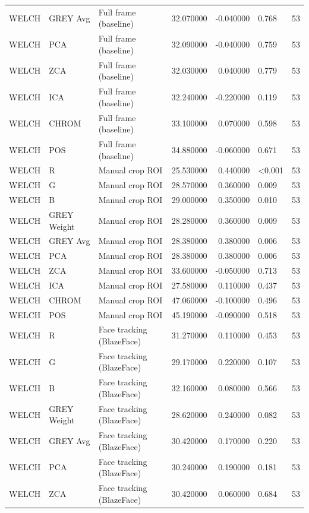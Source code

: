 \begin{table}[htbp]
\begin{tabular}{l l l r r l r}
WELCH & GREY Avg & Full frame (baseline) & 32.070000 & -0.040000 & 0.768 & 53 \\
WELCH & PCA & Full frame (baseline) & 32.090000 & -0.040000 & 0.759 & 53 \\
WELCH & ZCA & Full frame (baseline) & 32.030000 & 0.040000 & 0.779 & 53 \\
WELCH & ICA & Full frame (baseline) & 32.240000 & -0.220000 & 0.119 & 53 \\
WELCH & CHROM & Full frame (baseline) & 33.100000 & 0.070000 & 0.598 & 53 \\
WELCH & POS & Full frame (baseline) & 34.880000 & -0.060000 & 0.671 & 53 \\
WELCH & R & Manual crop ROI & 25.530000 & 0.440000 & <0.001 & 53 \\
WELCH & G & Manual crop ROI & 28.570000 & 0.360000 & 0.009 & 53 \\
WELCH & B & Manual crop ROI & 29.000000 & 0.350000 & 0.010 & 53 \\
WELCH & GREY Weight & Manual crop ROI & 28.280000 & 0.360000 & 0.009 & 53 \\
WELCH & GREY Avg & Manual crop ROI & 28.380000 & 0.380000 & 0.006 & 53 \\
WELCH & PCA & Manual crop ROI & 28.380000 & 0.380000 & 0.006 & 53 \\
WELCH & ZCA & Manual crop ROI & 33.600000 & -0.050000 & 0.713 & 53 \\
WELCH & ICA & Manual crop ROI & 27.580000 & 0.110000 & 0.437 & 53 \\
WELCH & CHROM & Manual crop ROI & 47.060000 & -0.100000 & 0.496 & 53 \\
WELCH & POS & Manual crop ROI & 45.190000 & -0.090000 & 0.518 & 53 \\
WELCH & R & Face tracking (BlazeFace) & 31.270000 & 0.110000 & 0.453 & 53 \\
WELCH & G & Face tracking (BlazeFace) & 29.170000 & 0.220000 & 0.107 & 53 \\
WELCH & B & Face tracking (BlazeFace) & 32.160000 & 0.080000 & 0.566 & 53 \\
WELCH & GREY Weight & Face tracking (BlazeFace) & 28.620000 & 0.240000 & 0.082 & 53 \\
WELCH & GREY Avg & Face tracking (BlazeFace) & 30.420000 & 0.170000 & 0.220 & 53 \\
WELCH & PCA & Face tracking (BlazeFace) & 30.240000 & 0.190000 & 0.181 & 53 \\
WELCH & ZCA & Face tracking (BlazeFace) & 30.420000 & 0.060000 & 0.684 & 53 \\

\end{tabular}
\end{table}
